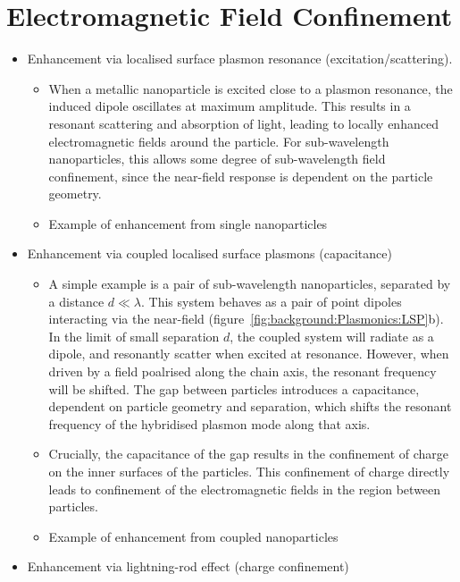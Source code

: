 \section{Electromagnetic Field Confinement}\label{sec:Plasmonics:confinement}
\begin{itemize}
    \item Enhancement via localised surface plasmon resonance (excitation/scattering). 
    \begin{itemize}
        \item When a metallic nanoparticle is excited close to a plasmon resonance, the induced dipole oscillates at maximum amplitude. This results in a resonant scattering and absorption of light, leading to locally enhanced electromagnetic fields around the particle. For sub-wavelength nanoparticles, this allows some degree of sub-wavelength field confinement, since the near-field response is dependent on the particle geometry.
        \item Example of enhancement from single nanoparticles
    \end{itemize}
    \item Enhancement via coupled localised surface plasmons (capacitance)
        \begin{itemize}
            \item A simple example is a pair of sub-wavelength nanoparticles, separated by a distance $d \ll \lambda$. This system behaves as a pair of point dipoles interacting via the near-field (figure~\ref{fig:background:Plasmonics:LSP}b). In the limit of small separation $d$, the coupled system will radiate as a dipole, and resonantly scatter when excited at resonance. However, when driven by a field poalrised along the chain axis, the resonant frequency will be shifted. The gap between particles introduces a capacitance, dependent on particle geometry and separation, which shifts the resonant frequency of the hybridised plasmon mode along that axis.
            \item Crucially, the capacitance of the gap results in the confinement of charge on the inner surfaces of the particles. This confinement of charge directly leads to confinement of the electromagnetic fields in the region between particles.
            \item Example of enhancement from coupled nanoparticles
        \end{itemize}
    \item Enhancement via lightning-rod effect (charge confinement)
    \begin{itemize}

\end{itemize}
\end{itemize}

